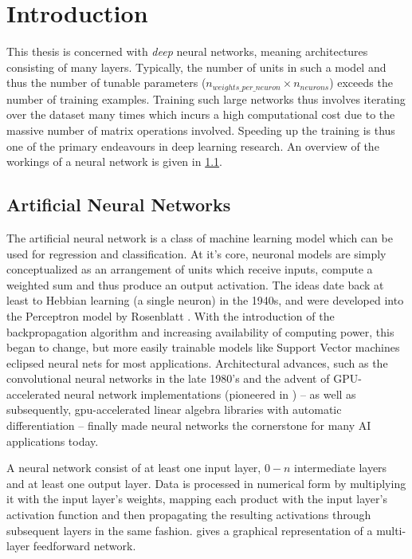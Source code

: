 \chapter{Introduction}\label{sec:introduction}

This thesis is concerned with \emph{deep} neural networks, meaning
architectures consisting of many layers. Typically, the number of units
in such a model and thus the number of tunable parameters
(\(n_{weights\_per\_neuron} \times n_{neurons}\)) exceeds the number of
training examples. Training such large networks thus involves iterating
over the dataset many times which incurs a high computational cost due
to the massive number of matrix operations involved. Speeding up the
training is thus one of the primary endeavours in deep learning
research. An overview of the workings of a neural network is given in
\cref{sec:anns}.

\hypertarget{sec:anns}{%
\section{Artificial Neural Networks}\label{sec:anns}}

The artificial neural network is a class of machine learning model which can be used for regression and classification.
At it's core, neuronal models are simply conceptualized as an arrangement of units which receive inputs, compute a
weighted sum and thus produce an output activation. The ideas date back at least to Hebbian learning (a single neuron)
in the 1940s, and were developed into the Perceptron model by Rosenblatt \citep{Rosenblatt58theperceptron}. With the
introduction of the backpropagation algorithm \citep{werbos1975beyond} and increasing availability of computing power,
this began to change, but more easily trainable models like Support Vector machines eclipsed neural nets for most
applications.  Architectural advances, such as the convolutional neural networks in the late 1980's
\citep{LeCun:1989:BAH:1351079.1351090} and the advent of GPU-accelerated neural network implementations (pioneered in
\cite{Ciresan11flexible}) -- as well as subsequently, gpu-accelerated linear algebra libraries with automatic
differentiation -- finally made neural networks the cornerstone for many AI applications today.

A neural network consist of at least one input layer, \(0-n\)
intermediate layers and at least one output layer. Data is processed in
numerical form by multiplying it with the input layer's weights, mapping
each product with the input layer's activation function and then
propagating the resulting activations through subsequent layers in the
same fashion.  gives a graphical representation of a
multi-layer feedforward network.

